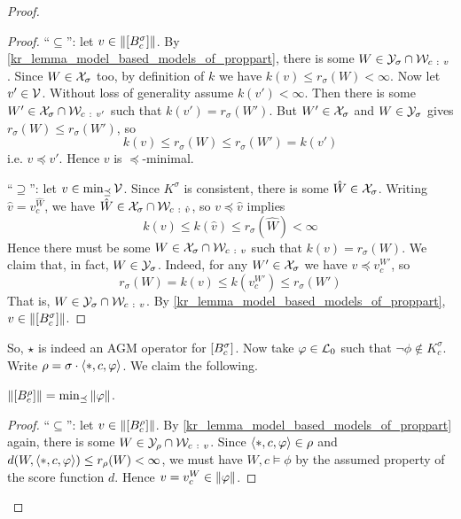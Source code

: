 \begin{proof}
\begin{proof}
            ``$\subseteq$'': let $v \in \|{\left[{B^\sigma_c}\right]}\|$. By
            \cref{kr_lemma_model_based_models_of_proppart}, there is some $W \in
            \Y_\sigma \cap \W_{c\ :\  v}$. Since $W \in \mathcal{X}_\sigma$ too, by
            definition of $k$ we have $k(v) \le r_\sigma(W) < \infty$. Now let
            $v' \in \mathcal{V}$. Without loss of generality assume $k(v') < \infty$.
            Then there is some $W' \in \mathcal{X}_\sigma \cap \mathcal{W}_{c\ :\  v'}$ such that
            $k(v') = r_\sigma(W')$. But $W' \in \mathcal{X}_\sigma$ and $W \in
            \mathcal{Y}_\sigma$ gives $r_\sigma(W) \le r_\sigma(W')$, so
            \[
                k(v) \le r_\sigma(W) \le r_\sigma(W') = k(v')
            \]
            i.e. $v \preceq v'$. Hence $v$ is $\preceq$-minimal.

            ``$\supseteq$'': let $v \in \min_{\preceq}\mathcal{V}$. Since $K^\sigma$
            is consistent, there is some $\hat{W} \in \mathcal{X}_\sigma$.  Writing
            $\hat{v} = v^{\hat{W}}_c$, we have $\hat{W} \in \mathcal{X}_\sigma \cap
            \mathcal{W}_{c\ :\ \hat{v}}$, so $v \preceq \hat{v}$ implies
            \[
                k(v)
                \le k(\hat{v})
                \le r_\sigma(\hat{W})
                < \infty
            \]
            Hence there must be some $W \in \X_\sigma \cap \W_{c\ :\ v}$ such
            that $k(v) = r_\sigma(W)$. We claim that, in fact, $W \in
            \mathcal{Y}_\sigma$. Indeed, for any $W' \in \mathcal{X}_\sigma$ we have $v \preceq
            v^{W'}_c$, so
            \[
                r_\sigma(W)
                = k(v)
                \le k(v^{W'}_c)
                \le r_\sigma(W')
            \]
            That is, $W \in \Y_\sigma \cap \W_{c\ :\  v}$. By
            \cref{kr_lemma_model_based_models_of_proppart}, $v \in
            \|{\left[{B^\sigma_c}\right]}\|$.
        \end{proof}

    So, $\star$ is indeed an AGM operator for $\left[{B^\sigma_c}\right]$. Now take
    $\varphi \in \mathcal{L}{}_0$ such that $\neg\phi \notin K^\sigma_c$. Write $\rho =
    \sigma \cdot \langle {\ast, c, \varphi} \rangle$. We claim the following.

        \begin{claim}
            \label{kr_claim_propmods_rho_min_models_of_phi}
            $\|{\left[{B^\rho_c}\right]}\| =
            \min\nolimits_{\preceq}{\|{\varphi}\|}$.
        \end{claim}
        \begin{proof}
            ``$\subseteq$'': let $v \in \|{\left[{B^\rho_c}\right]}\|$.  By
            \cref{kr_lemma_model_based_models_of_proppart} again, there is some $W
            \in \mathcal{Y}_\rho \cap \mathcal{W}_{c\ :\  v}$. Since $\langle {\ast, c, \varphi} \rangle \in
            \rho$ and $d(W, \langle {\ast, c, \varphi} \rangle) \le r_\rho(W) < \infty$, we
            must have $W, c \models \phi$ by the assumed property of the score
            function $d$. Hence $v = v^W_c \in \|{\varphi}\|$.


\end{proof}
\end{proof}
